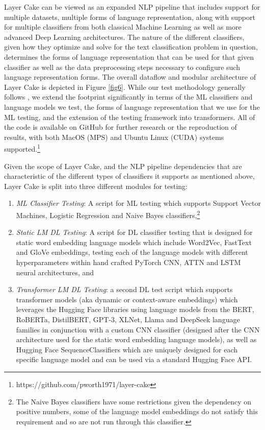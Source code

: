 \documentclass[final]{clv2025-revised}
\begin{document}
Layer Cake can be viewed as an expanded NLP pipeline that includes support for multiple datasets, multiple forms of language representation, along with support for multiple classifiers from both classical Machine Learning as well as more advanced Deep Learning architectures. The nature of the different classifiers, given how they optimize and solve for the text classification problem in question, determines the forms of language representation that can be used for that given classifier as well as the data preprocessing steps necessary to configure such language representation forms. The overall dataflow and modular architecture of Layer Cake is depicted in Figure \ref{fig6}. While our test methodology generally follows \cite{moreo2021}, we extend the footprint significantly in terms of the ML classifiers and language models we test, the forms of language representation that we use for the ML testing, and the extension of the testing framework into transformers. All of the code is available on GitHub for further research or the reproduction of results, with both MacOS (MPS) and Ubuntu Linux (CUDA) systems supported.\footnote{https://github.com/pworth1971/layer-cake}

Given the scope of Layer Cake, and the NLP pipeline dependencies that are characteristic of the different types of classifiers it supports as mentioned above, Layer Cake is split into three different modules for testing:
\begin{enumerate}
    \item \textit{ML Classifier Testing}: A script for ML testing which supports Support Vector Machines, Logistic Regression and Naive Bayes classifiers,\footnote{The Naive Bayes classifiers have some restrictions given the dependency on positive numbers, some of the language model embeddings do not satisfy this requirement and so are not run through this classifier.}
    \item \textit{Static LM DL Testing}: A script for DL classifier testing that is designed for static word embedding language models which include Word2Vec, FastText and GloVe embeddings, testing each of the language models with different hyperparameters within hand crafted PyTorch CNN, ATTN and LSTM neural architectures, and
    \item \textit{Transformer LM DL Testing}: a second DL test script which supports transformer models (aka dynamic or context-aware embeddings) which leverages the Hugging Face libraries using language models from the BERT, RoBERTa, DistilBERT, GPT-3, XLNet, Llama and DeepSeek language families in conjunction with a custom CNN classifier (designed after the CNN architecture used for the static word embedding language models), as well as Hugging Face SequenceClassifiers which are uniquely designed for each specific language model and can be used via a standard Hugging Face API.
\end{enumerate}
\end{document}
